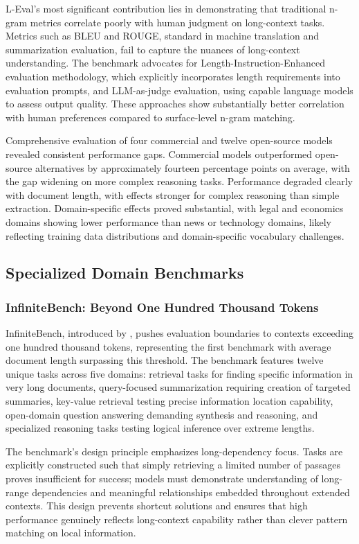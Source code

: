 L-Eval's most significant contribution lies in demonstrating that traditional n-gram metrics correlate poorly with human judgment on long-context tasks. Metrics such as BLEU and ROUGE, standard in machine translation and summarization evaluation, fail to capture the nuances of long-context understanding. The benchmark advocates for Length-Instruction-Enhanced evaluation methodology, which explicitly incorporates length requirements into evaluation prompts, and LLM-as-judge evaluation, using capable language models to assess output quality. These approaches show substantially better correlation with human preferences compared to surface-level n-gram matching.

Comprehensive evaluation of four commercial and twelve open-source models revealed consistent performance gaps. Commercial models outperformed open-source alternatives by approximately fourteen percentage points on average, with the gap widening on more complex reasoning tasks. Performance degraded clearly with document length, with effects stronger for complex reasoning than simple extraction. Domain-specific effects proved substantial, with legal and economics domains showing lower performance than news or technology domains, likely reflecting training data distributions and domain-specific vocabulary challenges.

\subsection{Specialized Domain Benchmarks}

\subsubsection{InfiniteBench: Beyond One Hundred Thousand Tokens}

InfiniteBench, introduced by \citet{zhang2024infinitebench}, pushes evaluation boundaries to contexts exceeding one hundred thousand tokens, representing the first benchmark with average document length surpassing this threshold. The benchmark features twelve unique tasks across five domains: retrieval tasks for finding specific information in very long documents, query-focused summarization requiring creation of targeted summaries, key-value retrieval testing precise information location capability, open-domain question answering demanding synthesis and reasoning, and specialized reasoning tasks testing logical inference over extreme lengths.

The benchmark's design principle emphasizes long-dependency focus. Tasks are explicitly constructed such that simply retrieving a limited number of passages proves insufficient for success; models must demonstrate understanding of long-range dependencies and meaningful relationships embedded throughout extended contexts. This design prevents shortcut solutions and ensures that high performance genuinely reflects long-context capability rather than clever pattern matching on local information.

